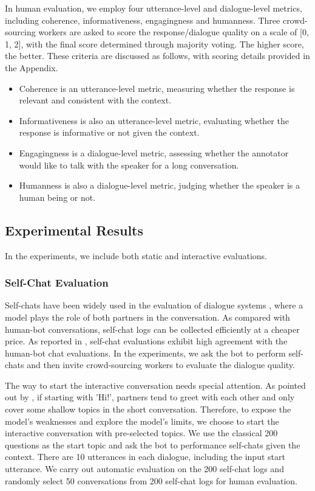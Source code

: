 \documentclass[11pt,a4paper]{article}
\begin{document}
	In human evaluation, we employ four utterance-level and dialogue-level metrics, including coherence, informativeness, engagingness and humanness. Three crowd-sourcing workers are asked to score the response/dialogue quality on a scale of [0, 1, 2], with the final score determined through majority voting. The higher score, the better. These criteria are discussed as follows, with scoring details provided in the Appendix.
	\begin{itemize}[leftmargin=*,noitemsep,topsep=0pt]
		\item Coherence is an utterance-level metric, measuring whether the response is relevant and consistent with the context.
		
		\item Informativeness is also an utterance-level metric, evaluating whether the response is informative or not given the context.
		
		\item Engagingness is a dialogue-level metric, assessing whether the annotator would like to talk with the speaker for a long conversation.
		
		\item Humanness is also a dialogue-level metric, judging whether the speaker is a human being or not.
	\end{itemize}
	
	\subsection{Experimental Results}
	In the experiments, we include both static and interactive evaluations. 
	
	\subsubsection{Self-Chat Evaluation}
	Self-chats have been widely used in the evaluation of dialogue systems \cite{li2016deep,bao2019know,roller2020recipes}, where a model plays the role of both partners in the conversation. As compared with human-bot conversations, self-chat logs can be collected efficiently at a cheaper price. As reported in , self-chat evaluations exhibit high agreement with the human-bot chat evaluations. In the experiments, we ask the bot to perform self-chats and then invite crowd-sourcing workers to evaluate the dialogue quality.
	
	The way to start the interactive conversation needs special attention. As pointed out by , if starting with 'Hi!', partners tend to greet with each other and only cover some shallow topics in the short conversation. Therefore, to expose the model's weaknesses and explore the model's limits, we choose to start the interactive conversation with pre-selected topics. We use the classical 200 questions as the start topic \cite{vinyals2015neural} and ask the bot to performance self-chats given the context. There are 10 utterances in each dialogue, including the input start utterance. We carry out automatic evaluation on the 200 self-chat logs and randomly select 50 conversations from 200 self-chat logs for human evaluation. 
	
\end{document}
